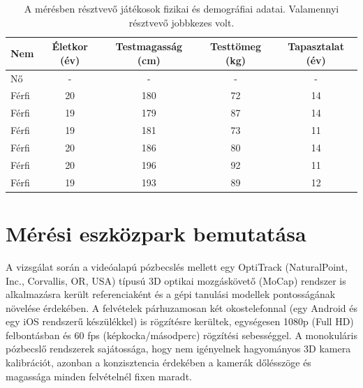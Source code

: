 \begin{table}[!ht]
    \centering
    \caption{A mérésben résztvevő játékosok fizikai és demográfiai adatai. Valamennyi résztvevő jobbkezes volt.}
    \label{tab:participants}
    \begin{tabular}{lcccc}
        \toprule
        \textbf{Nem} & \textbf{Életkor (év)} & \textbf{Testmagasság (cm)} & \textbf{Testtömeg (kg)} & \textbf{Tapasztalat (év)} \\
        \midrule
        Nő           & -                     & -                          & -                       & -                         \\
        Férfi        & 20                    & 180                        & 72                      & 14                        \\
        Férfi        & 19                    & 179                        & 87                      & 14                        \\
        Férfi        & 19                    & 181                        & 73                      & 11                        \\
        Férfi        & 20                    & 186                        & 80                      & 14                        \\
        Férfi        & 20                    & 196                        & 92                      & 11                        \\
        Férfi        & 19                    & 193                        & 89                      & 12                        \\
        \bottomrule
    \end{tabular}
\end{table}

\section{Mérési eszközpark bemutatása}
A vizsgálat során a videóalapú pózbecslés mellett egy OptiTrack (NaturalPoint, Inc., Corvallis, OR, USA) típusú 3D optikai mozgáskövető (MoCap) rendszer is alkalmazásra került referenciaként és a gépi tanulási modellek pontosságának növelése érdekében. A felvételek párhuzamosan két okostelefonnal (egy Android és egy iOS rendszerű készülékkel) is rögzítésre kerültek, egységesen 1080p (Full HD) felbontásban és 60 fps (képkocka/másodperc) rögzítési sebességgel. A monokuláris pózbecslő rendszerek sajátossága, hogy nem igényelnek hagyományos 3D kamera kalibrációt, azonban a konzisztencia érdekében a kamerák dőlésszöge és magassága minden felvételnél fixen maradt.


